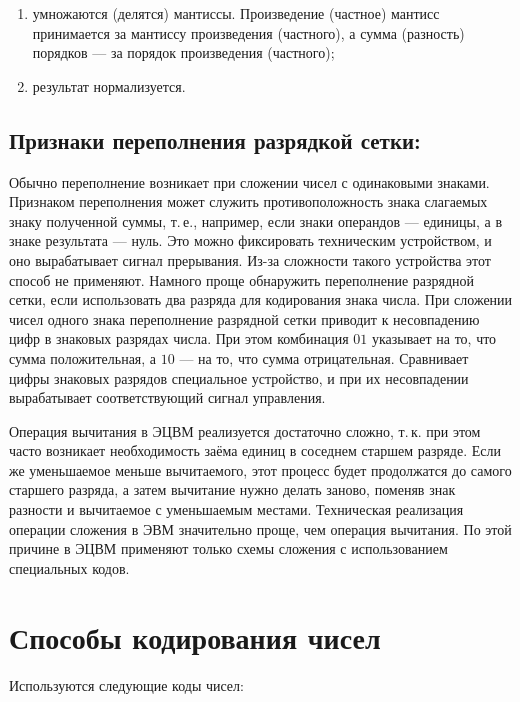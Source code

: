 \documentclass[10pt,a4paper,titlepage]{article}
\begin{document}
\begin{enumerate}
\item умножаются (делятся) мантиссы.
Произведение (частное) мантисс принимается за мантиссу произведения (частного), а сумма (разность) порядков --- за порядок произведения (частного);
\item результат нормализуется.
\end{enumerate}

\subsection{Признаки переполнения разрядкой сетки:}

Обычно переполнение возникает при сложении чисел с одинаковыми знаками.
Признаком переполнения может служить противоположность знака слагаемых знаку полученной суммы, т.\,е., например, если знаки операндов --- единицы, а в знаке результата --- нуль.
Это можно фиксировать техническим устройством, и оно вырабатывает сигнал прерывания.
Из-за сложности такого устройства этот способ не применяют.
Намного проще обнаружить переполнение разрядной сетки, если использовать два разряда для кодирования знака числа.
При сложении чисел одного знака переполнение разрядной сетки приводит к несовпадению цифр в знаковых разрядах числа.
При этом комбинация $01$ указывает на то, что сумма положительная, а $10$ --- на то, что сумма отрицательная.
Сравнивает цифры знаковых разрядов специальное устройство, и при их несовпадении вырабатывает соответствующий сигнал управления.

Операция вычитания в ЭЦВМ реализуется достаточно сложно, т.\,к. при этом часто возникает необходимость заёма единиц в соседнем старшем разряде.
Если же уменьшаемое меньше вычитаемого, этот процесс будет продолжатся до самого старшего разряда, а затем вычитание нужно делать заново, поменяв знак разности и вычитаемое с уменьшаемым местами.
Техническая реализация операции сложения в ЭВМ значительно проще, чем операция вычитания.
По этой причине в ЭЦВМ применяют только схемы сложения с использованием специальных кодов.

\newpage
\section{Способы кодирования чисел}

Используются следующие коды чисел:
\end{document}
